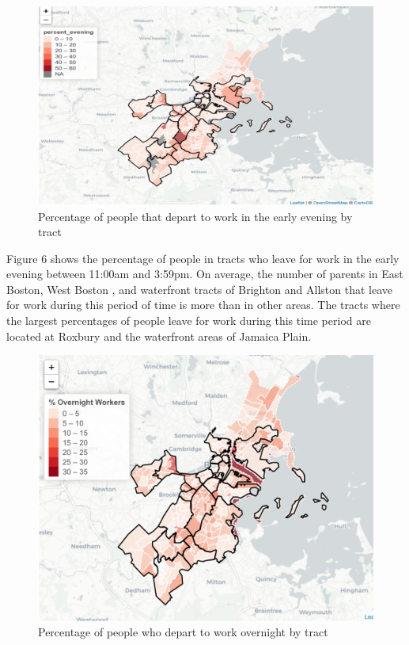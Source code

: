 \documentclass[10pt,letterpaper]{article}
\begin{document}
\begin{figure}

{\centering \includegraphics[width=1\linewidth]{fig5} 

}

\caption{Percentage of people that depart to work in the early evening by tract}\label{fig:unnamed-chunk-12}
\end{figure}

Figure 6 shows the percentage of people in tracts who leave for work in
the early evening between 11:00am and 3:59pm. On average, the number of
parents in East Boston, West Boston , and waterfront tracts of Brighton
and Allston that leave for work during this period of time is more than
in other areas. The tracts where the largest percentages of people leave
for work during this time period are located at Roxbury and the
waterfront areas of Jamaica Plain.

\begin{figure}

{\centering \includegraphics[width=0.8\linewidth]{fig6_percent_overnight} 

}

\caption{Percentage of people who depart to work overnight by tract}\label{fig:unnamed-chunk-13}
\end{figure}
\end{document}
